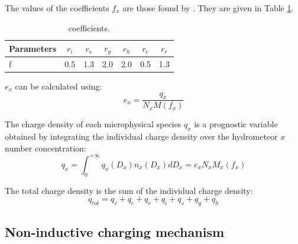 \noindent
The values of the coefficients $f_x$ are those found by \citet{Beard-1986}.
They are given in Table \ref{tab:beard_ochs}.

\begin{table}[h]
  \begin{center}
  \begin{tabular}{|l|c|c|c|c||c|c|}
    \hline
    Parameters & $r_i$ & $r_s$ & $r_g$ & $r_h$ & $r_c$ & $r_r$ \\
    \hline
    f & 0.5 & 1.3 & 2.0 & 2.0 & 0.5 & 1.3 \\
    \hline
  \end{tabular}
  \end{center}
  \caption{\small \citet{Beard-1986} coefficients.}
  \label{tab:beard_ochs}
\end{table}

\noindent
$e_x$ can be calculated using:
\begin{equation}
  e_x = \frac{q_x} {N_x M(f_x)}
\end{equation}

\noindent
The charge density of each microphysical species $q_x$ is a prognostic variable obtained by integrating the individual charge density over the hydrometeor $x$ number concentration:
\begin{equation}
  q_x = \int_0^{+\infty} q_x(D_x) n_x(D_x) dD_x = e_x N_x M_x (f_x)
\end{equation}

\noindent
The total charge density is the sum of the individual charge density:
\begin{equation}
  q_{tot} = q_v + q_c + q_r + q_i + q_s + q_g + q_h
\end{equation}


\subsection{Non-inductive charging mechanism}

